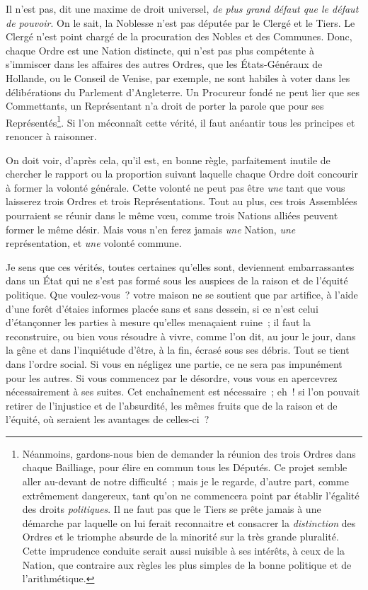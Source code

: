 \documentclass[french,twoside]{book} %
\begin{document}
Il n’est pas, dit une maxime de droit universel, {\itshape de plus grand défaut que le défaut de pouvoir}. On le sait, la Noblesse n’est pas députée par le Clergé et le Tiers. Le Clergé n’est point chargé de la procuration des Nobles et des Communes. Donc, chaque Ordre est une Nation distincte, qui n’est pas plus compétente à s’immiscer dans les affaires des autres Ordres, que les États-Généraux de Hollande, ou le Conseil de Venise, par exemple, ne sont habiles à voter dans les délibérations du Parlement d’Angleterre. Un Procureur fondé ne peut lier que ses Commettants, un Représentant n’a droit de porter la parole que pour ses Représentés\footnote{Néanmoins, gardons-nous bien de demander la réunion des trois Ordres dans chaque Bailliage, pour élire en commun tous les Députés. Ce projet semble aller au-devant de notre difficulté ; mais je le regarde, d’autre part, comme extrêmement dangereux, tant qu’on ne commencera point par établir l’égalité des droits {\itshape politiques}. Il ne faut pas que le Tiers se prête jamais à une démarche par laquelle on lui ferait reconnaitre et consacrer la {\itshape distinction} des Ordres et le triomphe absurde de la minorité sur la très grande pluralité. Cette imprudence conduite serait aussi nuisible à ses intérêts, à ceux de la Nation, que contraire aux règles les plus simples de la bonne politique et de l’arithmétique.}. Si l’on méconnaît cette vérité, il faut anéantir tous les principes et renoncer à raisonner.\par
On doit voir, d’après cela, qu’il est, en bonne règle, parfaitement inutile de chercher le rapport ou la proportion suivant laquelle chaque Ordre doit concourir à former la volonté générale. Cette volonté ne peut pas être {\itshape une} tant que vous laisserez trois Ordres et trois Représentations. Tout au plus, ces trois Assemblées pourraient se réunir dans le même vœu, comme trois Nations alliées peuvent former le même désir. Mais vous n’en ferez jamais {\itshape une} Nation, {\itshape une} représentation, et {\itshape une} volonté commune.\par
Je sens que ces vérités, toutes certaines qu’elles sont, deviennent embarrassantes dans un État qui ne s’est pas formé sous les auspices de la raison et de l’équité politique. Que voulez-vous ? votre maison ne se soutient que par artifice, à l’aide d’une forêt d’étaies informes placée sans et sans dessein, si ce n’est celui d’étançonner les parties à mesure qu’elles menaçaient ruine ; il faut la reconstruire, ou bien vous résoudre à vivre, comme l’on dit, au jour le jour, dans la gêne et dans l’inquiétude d’être, à la fin, écrasé sous ses débris. Tout se tient dans l’ordre social. Si vous en négligez une partie, ce ne sera pas impunément pour les autres. Si vous commencez par le désordre, vous vous en apercevrez nécessairement à ses suites. Cet enchaînement est nécessaire ; eh ! si l’on pouvait retirer de l’injustice et de l’absurdité, les mêmes fruits que de la raison et de l’équité, où seraient les avantages de celles-ci ?\par
\end{document}
